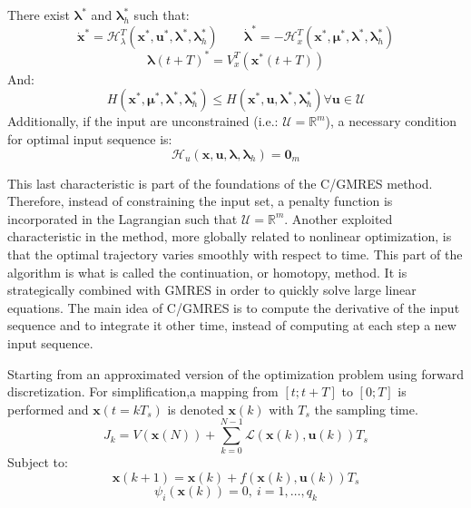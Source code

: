 \documentclass[a4paper, 12pt]{report}
\begin{document}
There exist $\boldsymbol{\lambda}^*$ and $\boldsymbol{\lambda}_h^*$ such that:
\[ \boldsymbol{\dot x}^* = \mathcal{H}_\lambda^T (\boldsymbol{x}^*, \boldsymbol{u}^*, \boldsymbol{\lambda}^*, \boldsymbol{\lambda}_h^*)  \qquad \boldsymbol{\dot \lambda}^*  = -\mathcal{H}_x^T (\boldsymbol{x}^*, \boldsymbol{\mu}^*, \boldsymbol{\lambda}^*, \boldsymbol{\lambda}_h^*)\]
\[ \boldsymbol{\lambda}(t+T)^* = V_x^T(\boldsymbol{x}^*(t+T)) \]
And:
\[ H(\boldsymbol{x}^*, \boldsymbol{\mu}^*, \boldsymbol{\lambda}^*, \boldsymbol{\lambda}_h^*) \leq H(\boldsymbol{x}^*, \boldsymbol{u}, \boldsymbol{\lambda}^*, \boldsymbol{\lambda}_h^*) \forall \boldsymbol{u} \in \mathcal{U} \]
Additionally, if the input are unconstrained (i.e.: $\mathcal{U}=\mathbb{R}^m$), a necessary condition for optimal input sequence is:
\[ \mathcal{H}_u (\boldsymbol{x}, \boldsymbol{u}, \boldsymbol{\lambda}, \boldsymbol{\lambda}_h) = \boldsymbol{0}_m \]
  
This last characteristic is part of the foundations of the C/GMRES method. Therefore, instead of constraining the input set, a penalty function is incorporated in the Lagrangian such that $\mathcal{U}=\mathbb{R}^m$. Another exploited characteristic in the method, more globally related to nonlinear optimization, is that the optimal trajectory varies smoothly with respect to time. This part of the algorithm is what is called the continuation, or homotopy, method. It is strategically combined with GMRES in order to quickly solve large linear equations. The main idea of C/GMRES is to compute the derivative of the input sequence and to integrate it other time, instead of computing at each step a new input sequence.

Starting from an approximated version of the optimization problem using forward discretization. For simplification,a mapping from $[t; t+T]$ to $[0; T]$ is performed and $\boldsymbol{x}(t = kT_s)$ is denoted $\boldsymbol{x}(k)$ with $T_s$ the sampling time.
\[ J_k = V(\boldsymbol{x}(N)) + \sum_{k = 0}^{N-1} \mathcal{L}(\boldsymbol{x}(k), \boldsymbol{u}(k))T_s \]
Subject to:
\[ \boldsymbol{x}(k+1) = \boldsymbol{x}(k) + f(\boldsymbol{x}(k),\boldsymbol{u}(k))T_s \]
\[ \psi_i(\boldsymbol{x}(k)) = 0,\ i = 1, \ldots, q_k \]
\end{document}

